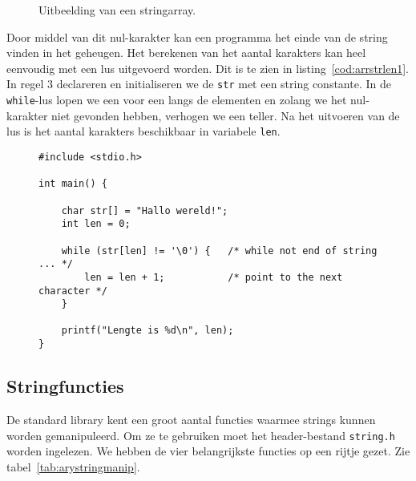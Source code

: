 \begin{figure}[H]
\centering
{}
\caption{Uitbeelding van een stringarray.}
\label{fig:arrastring}
\end{figure}

Door middel van dit nul-karakter kan een programma het einde van de string vinden in het geheugen. Het berekenen van het aantal karakters kan heel eenvoudig met een lus uitgevoerd worden. Dit is te zien in listing~\ref{cod:arrstrlen1}. In regel 3 declareren en initialiseren we de \texttt{str} met een string constante. In de \texttt{while}-lus lopen we een voor een langs de elementen en zolang we het nul-karakter niet gevonden hebben, verhogen we een teller. Na het uitvoeren van de lus is het aantal karakters beschikbaar in variabele \texttt{len}.

\begin{figure}[!ht]
\begin{lstlisting}[caption=Berekenen van de lengte van een string.,label=cod:arrstrlen1]
#include <stdio.h>

int main() {

    char str[] = "Hallo wereld!";
    int len = 0;

    while (str[len] != '\0') {   /* while not end of string ... */
        len = len + 1;           /* point to the next character */
    }

    printf("Lengte is %d\n", len);
}
\end{lstlisting}
\end{figure}

\subsection{Stringfuncties}
De standard library kent een groot aantal functies waarmee strings kunnen worden gemanipuleerd. Om ze te gebruiken moet het header-bestand \texttt{string.h} worden ingelezen. We hebben de vier belangrijkste functies op een rijtje gezet. Zie tabel~\ref{tab:arystringmanip}.

